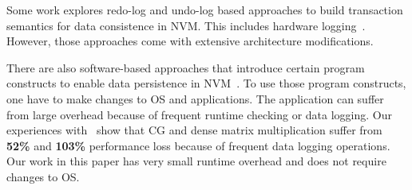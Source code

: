 \begin{spacing}{0.9}
\begin{comment}
Some work divides program execution into epochs. In the epoch, stores may
persistent concurrently. 
BPFS~\cite{sosp09:condit} is one of the pioneer work that explores the idea of epochs for NVM.  BPFS implements epochs by tightly coupling with cache management. In particular, BPFS tags all cache blocks with
an epoch ID on every store and modifies the cache replacement policy to write epochs back to NVM in order. 
Pelley et al.~\cite{Pelley:isca14} introduce a couple of variation of epoch,
and demonstrate potential performance improvement because of a relaxation of
inter-thread persist dependencies. 
Joshi et al.~\cite{micro15:joshi} propose a buffered epoch persistency by defining efficient persist barriers.
Delegated ordering~\cite{micro16:kolli} decouples cache management from the path persistent writes take to memory to allow concurrent writes within the same epoch to improve performance.
In essence, our performance optimization to improve cache flushing (see Section~\ref{sec:perf_opt}) uses the idea of the epoch. In our work, from the point where the cache flush happens to the point where one of the dual versions
is modified is an epoch where concurrent writes can happen to ensure persistency. 
Different from the existing work, our work does not need hardware support
to implicitly identify epochs. Our work rely on compiler and runtime
to decide the epoch (i.e., triggering and completing cache flushes).
\end{comment}

Some work explores redo-log and undo-log based approaches to build transaction semantics for data consistence in NVM.
This includes hardware logging~\cite{pm_iccd14, hpca17:joshi, stable_tr16:zhao}.
However, those approaches come with extensive architecture modifications.

There are also software-based approaches that introduce certain program constructs to enable data persistence in NVM~\cite{mnemosyne_asplos11, intel_nvm_lib, usenix13:rudoff, nv-heaps_asplos11, vldb_endow15:chatzistergiou, hpdc16:denny}. 
To use those program constructs, one have to make changes to OS and applications. 
The application can suffer from large overhead because of frequent runtime checking
or data logging. Our experiences with~\cite{intel_nvm_lib} show that CG and dense matrix multiplication 
suffer from \textbf{52\%} and \textbf{103\%} performance loss because of frequent data logging operations.
Our work in this paper has very small runtime overhead and does not require changes to OS.


\end{spacing}

